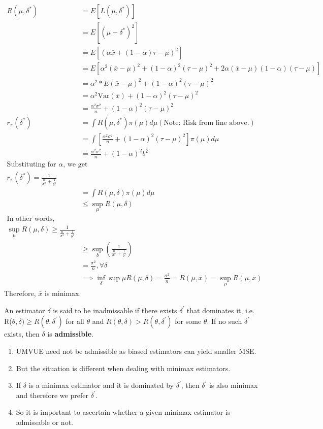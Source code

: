 \documentclass[11pt,fleqn]{book} %
\begin{document}
\begin{example}
	\begin{align*}
		R(\mu, \delta^*) &= E[L(\mu, \delta^*)]\\
		&= E[(\mu - \delta^*)^2]\\
		&= E[(\alpha \bar{x} + (1-\alpha)\tau - \mu)^2]\\
		&=E[\alpha^2(\bar{x}-\mu)^2 + (1-\alpha)^2(\tau - \mu)^2 + 2\alpha(\bar{x}-\mu)(1-\alpha)(\tau - \mu)]\\
		&= \alpha^2*E(\bar{x} - \mu)^2 + (1-\alpha)^2(\tau - \mu)^2\\
		&= \alpha^2 \text{Var}(\bar{x}) + (1-\alpha)^2(\tau - \mu)^2\\
		&= \frac{\alpha^2 \sigma^2}{n} + (1-\alpha)^2(\tau-\mu)^2\\
		r_\pi(\delta^*) &= \int R(\mu, \delta^*) \pi(\mu)d\mu (\text{Note: Risk from line above.})\\
		&= \int [\frac{\alpha^2\sigma^2}{n} + (1-\alpha)^2(\tau - \mu)^2]\pi(\mu)d\mu\\
		&= \frac{\alpha^2 \sigma^2}{n} + (1 - \alpha)^2 b^2\\
		\text{Substituting for $\alpha$, we get	}\\
		r_\pi(\delta^*) = \frac{1}{\frac{n}{\sigma^2}+\frac{1}{b^2}}\\
		&= \int R(\mu, \delta) \pi(\mu)d\mu\\
		&\le \sup_\mu R(\mu, \delta)\\
		\text{In other words},\\
		\sup_\mu R(\mu, \delta) \ge \frac{1}{\frac{n}{\sigma^2}+\frac{1}{b^2}}\\
		&\ge \sup_b \left(\frac{1}{\frac{n}{\sigma^2}+\frac{1}{b^2}}\right)\\
		&= \frac{\sigma^2}{n}, \forall \delta\\
		&\implies \inf_\delta \sup\mu R(\mu, \delta) = \frac{\sigma^2}{n} = R(\mu, \bar{x}) = \sup_\mu R(\mu, \bar{x})
	\end{align*}
	Therefore, $\bar{x}$ is minimax.
\end{example}

\begin{definition}[Admissibility]
An estimator $\delta$ is said to be inadmissable if there exists $\delta^\prime$ that dominates it, i.e. R($\theta, \delta) \ge R(\theta, \delta^\prime)$ for all $\theta$ and $R(\theta, \delta) > R(\theta, \delta^\prime)$ for some $\theta$. If no such $\delta^\prime$ exists, then $\delta$ is \textbf{admissible}. 
\begin{enumerate}[label = \alph*)]	
 		\item UMVUE need not be admissible as biased estimators can yield smaller MSE.
 		\item But the situation is different when dealing with minimax estimators.
 		\item If $\delta$ is a minimax estimator and it is dominated by $\delta^\prime$, then $\delta^\prime$ is also minimax and therefore we prefer $\delta^\prime$.
 		\item So it is important to ascertain whether a given minimax estimator is admissable or not.
 	\end{enumerate}	 	
\end{definition}
\end{document}
